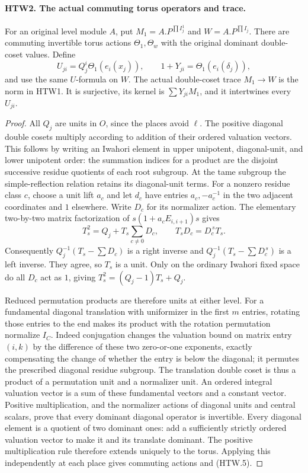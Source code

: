 \documentclass[11pt,a4paper]{article}
\numberwithin{equation}{section}
\theoremstyle{remark}\newtheorem{remark}[theorem]{Remark}
\begin{document}
\paragraph{HTW2. The actual commuting torus operators and trace.}
\label{claim:HTW2}
For an original level module \(A\), put
\(M_1=A.P^{\prod I_j^1}\) and \(W=A.P^{\prod I_j}\).
There are commuting invertible torus actions \(\Theta_1,\Theta_w\)
with the original dominant double-coset values.  Define
\[
 U_{ji}=Q_j^i\Theta_1(e_i(x_j)),\qquad
 1+Y_{ji}=\Theta_1(e_i(\delta_j)),
 \tag{HTW.5}
\]
and use the same \(U\)-formula on \(W\).  The actual
double-coset trace \(M_1\to W\) is the norm in HTW1.
It is surjective, its kernel is \(\sum Y_{ji}M_1\), and
it intertwines every \(U_{ji}\).
\begin{proof}
All \(Q_j\) are units in \(O\), since the places avoid
\(\ell\).  The positive diagonal double cosets multiply
according to addition of their ordered valuation vectors.
This follows by writing an Iwahori element in upper
unipotent, diagonal-unit, and lower unipotent order:
the summation indices for a product are the disjoint
successive residue quotients of each root subgroup.
At the tame subgroup the simple-reflection relation
retains its diagonal-unit terms.  For a nonzero residue
class \(c\), choose a unit lift \(a_c\) and let \(d_c\)
have entries \(a_c,-a_c^{-1}\) in the two adjacent
coordinates and \(1\) elsewhere.  Write \(D_c\) for
its normalizer action.  The elementary two-by-two
matrix factorization of \(s(1+a_cE_{i,i+1})s\) gives
\[
 T_s^2=Q_j+T_s\sum_{c\ne0}D_c,\qquad
       T_sD_c=D_c^{\,s}T_s .
\]
Consequently \(Q_j^{-1}(T_s-\sum D_c)\) is a right
inverse and \(Q_j^{-1}(T_s-\sum D_c^{\,s})\) is a
left inverse.  They agree, so \(T_s\) is a unit.
Only on the ordinary Iwahori fixed space do all
\(D_c\) act as \(1\), giving
\(T_s^2=(Q_j-1)T_s+Q_j\).

Reduced permutation products are therefore units at
either level.  For a fundamental diagonal translation
with uniformizer in the first \(m\) entries, rotating
those entries to the end makes its product with the
rotation permutation normalize \(I_C\).  Indeed
conjugation changes the valuation bound on matrix
entry \((i,k)\) by the difference of these two
zero-or-one exponents, exactly compensating the
change of whether the entry is below the diagonal;
it permutes the prescribed diagonal residue subgroup.
The translation double coset is thus a product of
a permutation unit and a normalizer unit.
An ordered integral valuation vector is a sum of
these fundamental vectors and a constant vector.
Positive multiplication, and the normalizer actions
of diagonal units and central scalars, prove that
every dominant diagonal operator is invertible.
Every diagonal element is a quotient of two
dominant ones: add a sufficiently strictly ordered
valuation vector to make it and its translate dominant.
The positive multiplication rule therefore extends
uniquely to the torus.  Applying this independently at
each place gives commuting actions and (HTW.5).


\end{proof}
\end{document}
